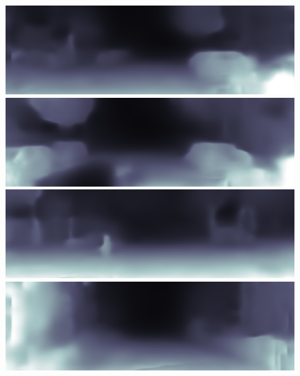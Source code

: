 \documentclass{svjour3}                     %
\begin{document}
\begin{figure}[t]
{\begin{minipage}[b]{0.15\linewidth}
  \includegraphics[width=1\linewidth]{images/kitti_sfm/2011_09_26_drive_0009_sync_0000000260.png}\vspace{3.5pt}
  \includegraphics[width=1\linewidth]{images/kitti_sfm/2011_09_26_drive_0009_sync_0000000340.png}\vspace{3.5pt}
  \includegraphics[width=1\linewidth]{images/kitti_sfm/2011_09_26_drive_0009_sync_0000000388.png}\vspace{3.5pt}
  \includegraphics[width=1\linewidth]{images/kitti_sfm/2011_09_30_drive_0018_sync_0000000642.png}
  \end{minipage}}
\end{figure}
\end{document}
